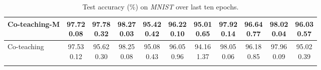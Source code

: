 \documentclass[11pt]{article}
\begin{document}
\begin{table}[!htbp]
\begin{tabular}{l |cc|cc|cc|cc|cc}
			Co-teaching-M & \makecell{97.72\\ \scriptsize{0.08}} & \makecell{97.78\\ \scriptsize{0.32}} & \makecell{98.27\\ \scriptsize{0.03}} & \makecell{95.42\\ \scriptsize{0.42}} & \makecell{96.22\\ \scriptsize{0.10}} & \makecell{95.01\\ \scriptsize{0.65}}&\makecell{97.92\\ \scriptsize{0.14}}&\makecell{96.64\\ \scriptsize{0.77}}&\makecell{98.02\\ \scriptsize{0.04}}&\makecell{96.03\\ \scriptsize{0.57}}\\
			\hline
			Co-teaching  & \makecell{97.53\\ \scriptsize{0.12}} & \makecell{95.62\\ \scriptsize{0.30}} & \makecell{98.25\\ \scriptsize{0.08}} & \makecell{95.08\\ \scriptsize{0.43}} & \makecell{96.05\\ \scriptsize{0.96}} & \makecell{94.16\\ \scriptsize{1.37}} & \makecell{98.05\\ \scriptsize{0.06}} & \makecell{96.18\\ \scriptsize{0.85}} & \makecell{97.96\\ \scriptsize{0.09}} & \makecell{95.02\\ \scriptsize{0.39}}\\
			
		\Xhline{3\arrayrulewidth}
\end{tabular}
\caption
		{
Test accuracy (\%) on \textit{MNIST} over last ten epochs.
		}
	\label{tab:ablation_mnist}
\end{table}		
\end{document}
